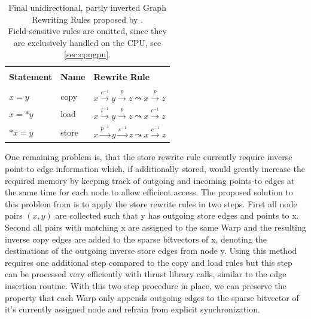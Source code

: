 \begin{table}
    \begin{center}
        \caption[List of Graph Rewriting Rules in use by PTAGPU]{Final unidirectional, partly inverted Graph Rewriting Rules proposed by \cite{mendez2012gpu}.\\Field-sensitive rules are omitted, since they are exclusively handled on the CPU, see \autoref{sec:cpugpu}.}
        \label{tab:rewrite-rules}
        \begin{tabular}{l|l|l}
            \hline                                                                                                                             \\
            \textbf{Statement} & \textbf{Name} & \textbf{Rewrite Rule}                                                                         \\
            \hline                                                                                                                             \\
            $x = y$            & copy          & $x \xrightarrow{c^{-1}} y \xrightarrow{p} z \mathrel{\leadsto} x \xrightarrow{p} z$           \\
            $x = *y$           & load          & $x \xrightarrow{l^{-1}} y \xrightarrow{p} z \mathrel{\leadsto} x \xrightarrow{c^{-1}} z$      \\
            $*x = y$           & store         & $x \xrightarrow{p^{-1}} y \xrightarrow{s^{-1}} z \mathrel{\leadsto} x \xrightarrow{c^{-1}} z$ \\
        \end{tabular}
    \end{center}
\end{table}
One remaining problem is, that the store rewrite rule currently require inverse point-to edge information which, if additionally stored, would greatly increase the required memory by keeping track of outgoing and incoming points-to edges at the same time for each node to allow efficient access.
The proposed solution to this problem from \cite{mendez2012gpu} is to apply the store rewrite rules in two steps. First all node pairs $(x,y)$ are collected such that y has outgoing store edges and points to x. Second all pairs with matching x are assigned to the same Warp and the resulting inverse copy edges are added to the sparse bitvectors of x, denoting the destinations of the outgoing inverse store edges from node y.
Using this method requires one additional step compared to the copy and load rules but this step can be processed very efficiently with thrust library calls, similar to the edge insertion routine.
With this two step procedure in place, we can preserve the property that each Warp only appends outgoing edges to the sparse bitvector of it's currently assigned node and refrain from explicit synchronization.
